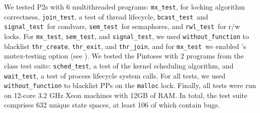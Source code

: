 \newcommand\mxtest{\texttt{mx\_test}}
\newcommand\tej{\texttt{join\_test}}
\newcommand\bct{\texttt{bcast\_test}}
\newcommand\paraguay{\texttt{signal\_test}}
\newcommand\paradise{\texttt{sem\_test}}
\newcommand\rwl{\texttt{rwl\_test}}
We tested P2s with 6 multithreaded programs:
\mxtest, for locking algorithm correctness,
\tej, a test of thread lifecycle,
\bct~and \paraguay~for condvars,
\paradise~for semaphores,
and \rwl~for r/w locks.
For \mxtest, \paradise, and \paraguay, we used {\tt without\_function} to blacklist {\tt thr\_create}, {\tt thr\_exit}, and {\tt thr\_join},
and for \mxtest~we enabled \landslide's mutex-testing option
(see \sect{\ref{sec:landslide}}).
\newcommand\prisema{\texttt{sched\_test}}
\newcommand\waitsimple{\texttt{wait\_test}}
We tested the Pintoses with 2 programs from the class test suite: \prisema, a test of the kernel scheduling algorithm, and \waitsimple, a test of process lifecycle system calls.
For all tests, we used {\tt without\_function} to blacklist PPs on the {\tt malloc} lock.
Finally, all tests were run on 12-core 3.2 GHz Xeon machines with 12GB of RAM.
In total, the test suite comprises 632 unique state spaces, at least 106 of which contain bugs.

%

